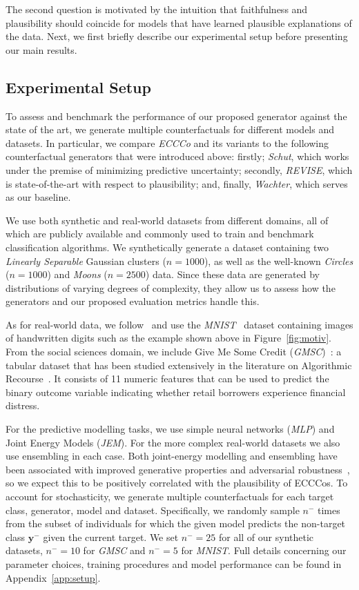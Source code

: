 \documentclass{article}
\begin{document}
The second question is motivated by the intuition that faithfulness and plausibility should coincide for models that have learned plausible explanations of the data. Next, we first briefly describe our experimental setup before presenting our main results.

\subsection{Experimental Setup}

To assess and benchmark the performance of our proposed generator against the state of the art, we generate multiple counterfactuals for different models and datasets. In particular, we compare \textit{ECCCo} and its variants to the following counterfactual generators that were introduced above: firstly; \textit{Schut}, which works under the premise of minimizing predictive uncertainty; secondly, \textit{REVISE}, which is state-of-the-art with respect to plausibility; and, finally, \textit{Wachter}, which serves as our baseline. 

We use both synthetic and real-world datasets from different domains, all of which are publicly available and commonly used to train and benchmark classification algorithms. We synthetically generate a dataset containing two \textit{Linearly Separable} Gaussian clusters ($n=1000$), as well as the well-known \textit{Circles} ($n=1000$) and \textit{Moons} ($n=2500$) data. Since these data are generated by distributions of varying degrees of complexity, they allow us to assess how the generators and our proposed evaluation metrics handle this.

As for real-world data, we follow~\citet{schut2021generating} and use the \textit{MNIST}~\citep{lecun1998mnist} dataset containing images of handwritten digits such as the example shown above in Figure~\ref{fig:motiv}. From the social sciences domain, we include Give Me Some Credit (\textit{GMSC})~\citep{kaggle2011give}: a tabular dataset that has been studied extensively in the literature on Algorithmic Recourse~\citep{pawelczyk2021carla}. It consists of 11 numeric features that can be used to predict the binary outcome variable indicating whether retail borrowers experience financial distress. 

For the predictive modelling tasks, we use simple neural networks (\textit{MLP}) and Joint Energy Models (\textit{JEM}). For the more complex real-world datasets we also use ensembling in each case. Both joint-energy modelling and ensembling have been associated with improved generative properties and adversarial robustness~\citep{grathwohl2020your,lakshminarayanan2016simple}, so we expect this to be positively correlated with the plausibility of ECCCos. To account for stochasticity, we generate multiple counterfactuals for each target class, generator, model and dataset. Specifically, we randomly sample $n^{-}$ times from the subset of individuals for which the given model predicts the non-target class $\mathbf{y}^{-}$ given the current target. We set $n^{-}=25$ for all of our synthetic datasets, $n^{-}=10$ for \textit{GMSC} and $n^{-}=5$ for \textit{MNIST}. Full details concerning our parameter choices, training procedures and model performance can be found in Appendix~\ref{app:setup}.
\end{document}
